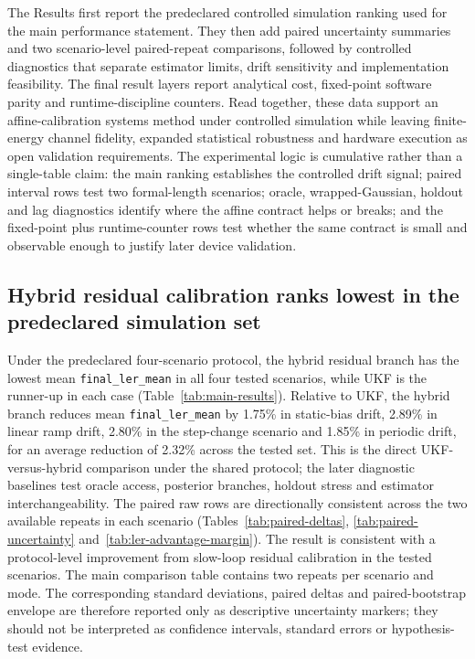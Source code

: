 \documentclass[11pt]{article}
\newcommand{\softwarehil}{controlled simulation}
\newcommand{\finalLER}{\texttt{final\_ler\_mean}}
\begin{document}
The Results first report the predeclared \softwarehil{} ranking used for the
main performance statement.  They then add paired uncertainty summaries and
two scenario-level paired-repeat comparisons, followed by controlled
diagnostics that separate estimator limits, drift sensitivity and
implementation feasibility.
The final result layers report analytical cost, fixed-point software parity
and runtime-discipline counters.  Read together, these data support an
affine-calibration systems method under controlled simulation while leaving
finite-energy channel fidelity, expanded statistical robustness and hardware
execution as open validation requirements.
The experimental logic is cumulative rather than a single-table claim: the
main ranking establishes the controlled drift signal; paired interval rows test
two formal-length scenarios; oracle, wrapped-Gaussian, holdout and lag
diagnostics identify where the affine contract helps or breaks; and the
fixed-point plus runtime-counter rows test whether the same contract is small
and observable enough to justify later device validation.

\subsection{Hybrid residual calibration ranks lowest in the predeclared simulation set}

Under the predeclared four-scenario protocol, the hybrid residual branch has
the lowest mean \finalLER{} in all four tested scenarios, while UKF is the
runner-up in each case (Table~\ref{tab:main-results}).  Relative to UKF, the
hybrid branch reduces mean \finalLER{} by 1.75\% in static-bias drift, 2.89\%
in linear ramp drift, 2.80\% in the step-change scenario and 1.85\% in periodic
drift, for an average reduction of 2.32\% across the tested set.  This is the
direct UKF-versus-hybrid comparison under the shared protocol; the later
diagnostic baselines test oracle access, posterior branches, holdout stress
and estimator interchangeability.  The paired
raw rows are directionally consistent across the two available repeats in each
scenario (Tables~\ref{tab:paired-deltas}, \ref{tab:paired-uncertainty}
and~\ref{tab:ler-advantage-margin}).
The result is consistent with a protocol-level improvement from slow-loop
residual calibration in the tested scenarios.  The main comparison table
contains two repeats per scenario and mode.  The corresponding standard
deviations, paired deltas and paired-bootstrap envelope are therefore reported
only as descriptive uncertainty markers; they should not be interpreted as
confidence intervals, standard errors or hypothesis-test evidence.
\end{document}
